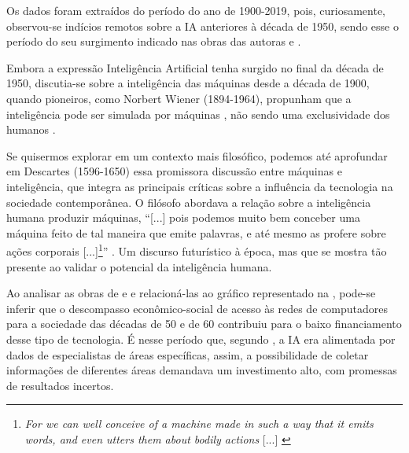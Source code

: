\documentclass[portuguese]{textolivre}
\begin{document}
Os dados foram extraídos do período do ano de 1900-2019, pois, curiosamente, observou-se indícios remotos sobre a IA anteriores à década de 1950, sendo esse o período do seu surgimento indicado nas obras das autoras \textcite{2022kaufman} e \textcite{santaella2023inteligencia}.

Embora a expressão Inteligência Artificial tenha surgido no final da década de 1950, discutia-se sobre a inteligência das máquinas desde a década de 1900, quando pioneiros, como Norbert Wiener (1894-1964), propunham que a inteligência pode ser simulada por máquinas \cite{ribas2020}, não sendo uma exclusividade dos humanos \cite{santaella2023inteligencia}.

Se quisermos explorar em um contexto mais filosófico, podemos até aprofundar em Descartes (1596-1650) essa promissora discussão entre máquinas e inteligência, que integra as principais críticas sobre a influência da tecnologia na sociedade contemporânea. O filósofo abordava a relação sobre a inteligência humana produzir máquinas, “[...] pois podemos muito bem conceber uma máquina feito de tal maneira que emite palavras, e até mesmo as profere sobre ações corporais [...]\footnote{\emph{For we can well conceive of a machine made in such a way that it emits words, and even utters them about bodily actions} [...] \cite[p. 57]{mclean2006}}” \cite[p. 57, tradução nossa]{mclean2006}. Um discurso futurístico à época, mas que se mostra tão presente ao validar o potencial da inteligência humana.

Ao analisar as obras de \textcite{2022kaufman} e \textcite{santaella2023inteligencia} e relacioná-las ao gráfico representado na , pode-se inferir que o descompasso econômico-social de acesso às redes de computadores para a sociedade das décadas de 50 e de 60 contribuiu para o baixo financiamento desse tipo de tecnologia. É nesse período que, segundo \textcite{santaella2023inteligencia}, a IA era alimentada por dados de especialistas de áreas específicas, assim, a possibilidade de coletar informações de diferentes áreas demandava um investimento alto, com promessas de resultados incertos. 
\end{document}
